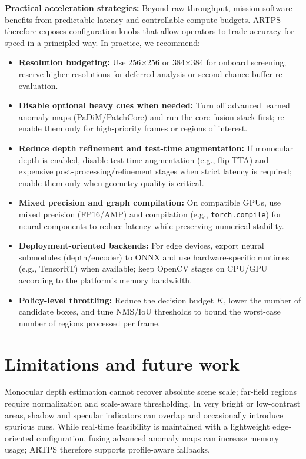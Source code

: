 \documentclass[12pt]{article}
\begin{document}
\textbf{Practical acceleration strategies:} Beyond raw throughput, mission software benefits from predictable latency and controllable compute budgets. ARTPS therefore exposes configuration knobs that allow operators to trade accuracy for speed in a principled way. In practice, we recommend:
\begin{itemize}
\item \textbf{Resolution budgeting:} Use 256\(\times\)256 or 384\(\times\)384 for onboard screening; reserve higher resolutions for deferred analysis or second-chance buffer re-evaluation.
\item \textbf{Disable optional heavy cues when needed:} Turn off advanced learned anomaly maps (PaDiM/PatchCore) and run the core fusion stack first; re-enable them only for high-priority frames or regions of interest.
\item \textbf{Reduce depth refinement and test-time augmentation:} If monocular depth is enabled, disable test-time augmentation (e.g., flip-TTA) and expensive post-processing/refinement stages when strict latency is required; enable them only when geometry quality is critical.
\item \textbf{Mixed precision and graph compilation:} On compatible GPUs, use mixed precision (FP16/AMP) and compilation (e.g., \texttt{torch.compile}) for neural components to reduce latency while preserving numerical stability.
\item \textbf{Deployment-oriented backends:} For edge devices, export neural submodules (depth/encoder) to ONNX and use hardware-specific runtimes (e.g., TensorRT) when available; keep OpenCV stages on CPU/GPU according to the platform's memory bandwidth.
\item \textbf{Policy-level throttling:} Reduce the decision budget \(K\), lower the number of candidate boxes, and tune NMS/IoU thresholds to bound the worst-case number of regions processed per frame.
\end{itemize}

\section{Limitations and future work}
Monocular depth estimation cannot recover absolute scene scale; far-field regions require normalization and scale-aware thresholding. In very bright or low-contrast areas, shadow and specular indicators can overlap and occasionally introduce spurious cues. While real-time feasibility is maintained with a lightweight edge-oriented configuration, fusing advanced anomaly maps can increase memory usage; ARTPS therefore supports profile-aware fallbacks.
\end{document}

